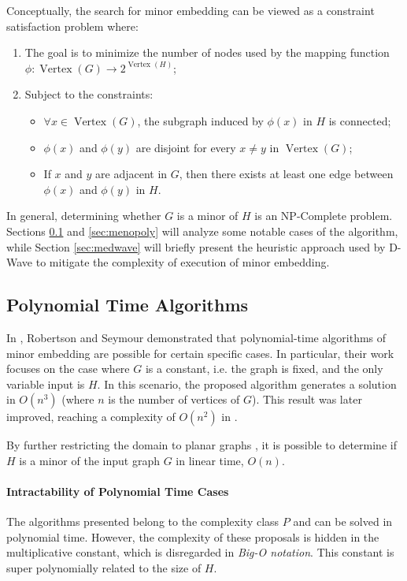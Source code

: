 Conceptually, the search for minor embedding can be viewed as a constraint satisfaction problem where:
\begin{enumerate}
    \item The goal is to minimize the number of nodes used by the mapping function $\phi: \operatorname{Vertex}(G) \to 2^{\operatorname{Vertex}(H)}$;
    \item Subject to the constraints:
    \begin{itemize}
        \item $\forall x\in \operatorname{Vertex}(G)$, the subgraph induced by $\phi(x)$ in $H$ is connected;
        \item $\phi(x)$ and $\phi(y)$ are disjoint for every $x \neq y$ in $\operatorname{Vertex}(G)$;
        \item If $x$ and $y$ are adjacent in $G$, then there exists at least one edge between $\phi(x)$ and $\phi(y)$ in $H$.
    \end{itemize}
\end{enumerate}

In general, determining whether $G$ is a minor of $H$ is an NP-Complete problem. 
Sections \ref{sec:mepoly} and \ref{sec:menopoly} will analyze some notable cases of the algorithm, while Section \ref{sec:medwave} will briefly present the heuristic approach used by D-Wave to mitigate the complexity of execution of minor embedding.

\subsection{Polynomial Time Algorithms}\label{sec:mepoly}

In \cite{MEPoly}, Robertson and Seymour demonstrated that polynomial-time algorithms of minor embedding are possible for certain specific cases. 
In particular, their work focuses on the case where $G$ is a constant, i.e. the graph is fixed, and the only variable input is $H$. 
In this scenario, the proposed algorithm generates a solution in $O(n^3)$ (where $n$ is the number of vertices of $G$). 
This result was later improved, reaching a complexity of $O(n^2)$ in \cite{MEPoly2}.

By further restricting the domain to planar graphs \cite{MEPoly3}, it is possible to determine if $H$ is a minor of the input graph $G$ in linear time, $O(n)$.

\paragraph{Intractability of Polynomial Time Cases} The algorithms presented belong to the complexity class $P$ and can be solved in polynomial time. 
However, the complexity of these proposals is hidden in the multiplicative constant, which is disregarded in \emph{Big-O notation}. 
This constant is super polynomially related to the size of $H$.

